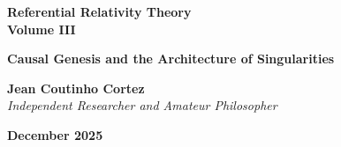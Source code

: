 \documentclass[12pt, a4paper]{article}
\begin{document}
\begin{titlepage}
    \vspace*{\fill}
    \begin{center}
        {\LARGE \textbf{Referential Relativity Theory}} \\
        \vspace{0.3cm} 
        {\LARGE \textbf{Volume III}} \\
        
        \vspace{0.6cm}
        
        {\Large \textbf{Causal Genesis and the Architecture of Singularities}} \\
        \vspace{2.5cm}
        
        {\large \textbf{Jean Coutinho Cortez}} \\
        \textit{Independent Researcher and Amateur Philosopher} \\
        \vspace{1.2cm}
        
        \textbf{December 2025}
    \end{center}
    \vspace*{\fill}
\end{titlepage}

\newpage
\end{document}
